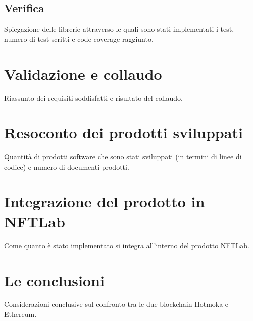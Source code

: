 \subsection{Verifica}
Spiegazione delle librerie attraverso le quali sono stati implementati i test, numero di test scritti e code coverage raggiunto.


\section{Validazione e collaudo}
Riassunto dei requisiti soddisfatti e risultato del collaudo.


\section{Resoconto dei prodotti sviluppati}
Quantità di prodotti software che sono stati sviluppati (in termini di linee di codice) e numero di documenti prodotti.


\section{Integrazione del prodotto in NFTLab}
Come quanto è stato implementato si integra all'interno del prodotto NFTLab.


\section{Le conclusioni}
Considerazioni conclusive sul confronto tra le due blockchain Hotmoka e Ethereum.
